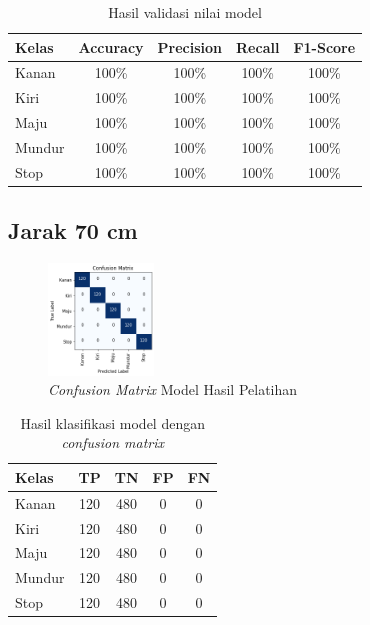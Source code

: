 \begin{longtable}{|l|c|c|c|c|}
  \caption{Hasil validasi nilai model}
  \label{tb:vs_model3} \\
  \hline
  \rowcolor[HTML]{C0C0C0} 
  \textbf{Kelas} & \textbf{Accuracy} & \textbf{Precision} & \textbf{Recall} & \textbf{F1-Score} \\ \hline
  Kanan    & 100\%            & 100\%             & 100\%           & 100\%            \\ \hline
  Kiri     & 100\%          & 100\%           & 100\%           & 100\%           \\ \hline
  Maju      & 100\%          & 100\%           & 100\%          & 100\%          \\ \hline
  Mundur     & 100\%            & 100\%             & 100\%           & 100\%            \\ \hline
  Stop  & 100\%            & 100\%             & 100\%           & 100\%            \\ \hline
\end{longtable}

\subsection{Jarak 70 cm}

\begin{figure} [ht] \centering
  \includegraphics[width=0.25\textwidth]{gambar/bab4/model7 (70cm)/matrix.png}
  \caption{\emph{Confusion Matrix} Model Hasil Pelatihan}
  \label{fig:matrix4}
\end{figure}

\begin{longtable}{|l|c|c|c|c|}
  \caption{Hasil klasifikasi model dengan \emph{confusion matrix}}
  \label{tb:cm_model4} \\
  \hline
  \rowcolor[HTML]{C0C0C0} 
  \textbf{Kelas} & \textbf{TP} & \textbf{TN} & \textbf{FP} & \textbf{FN} \\ \hline
  Kanan    & 120          & 480         & 0           & 0           \\ \hline
  Kiri      & 120          & 480         & 0           & 0           \\ \hline
  Maju      & 120          & 480         & 0           & 0           \\ \hline
  Mundur     & 120          & 480         & 0           & 0           \\ \hline
  Stop  & 120          & 480         & 0           & 0           \\ \hline
\end{longtable}

